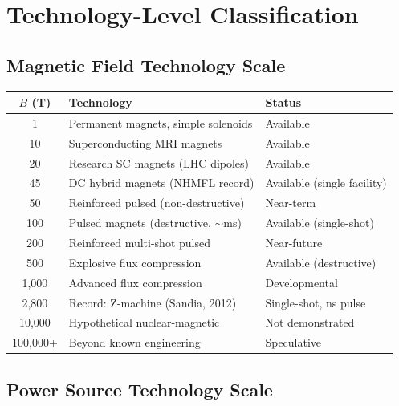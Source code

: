 \documentclass[12pt,a4paper]{article}
\begin{document}
\section{Technology-Level Classification}\label{sec:civlevel}

\subsection{Magnetic Field Technology Scale}

\begin{center}
\begin{tabular}{cll}
\toprule
\textbf{$B$ (T)} & \textbf{Technology} & \textbf{Status} \\
\midrule
1     & Permanent magnets, simple solenoids    & Available \\
10    & Superconducting MRI magnets             & Available \\
20    & Research SC magnets (LHC dipoles)        & Available \\
45    & DC hybrid magnets (NHMFL record)         & Available (single facility) \\
50    & Reinforced pulsed (non-destructive)       & Near-term \\
100   & Pulsed magnets (destructive, $\sim$ms)    & Available (single-shot) \\
200   & Reinforced multi-shot pulsed              & Near-future \\
500   & Explosive flux compression                & Available (destructive) \\
1{,}000  & Advanced flux compression             & Developmental \\
2{,}800  & Record: Z-machine (Sandia, 2012)      & Single-shot, ns pulse \\
10{,}000 & Hypothetical nuclear-magnetic          & Not demonstrated \\
100{,}000+ & Beyond known engineering             & Speculative \\
\bottomrule
\end{tabular}
\end{center}

\subsection{Power Source Technology Scale}
\end{document}
